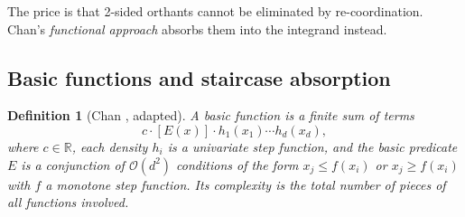\documentclass[11pt,a4paper]{article}
\newtheorem{definition}{Definition}
\theoremstyle{remark}
\newcommand{\R}{\mathbb{R}}
\newcommand{\Oh}{\mathcal{O}}
\begin{document}
The price is that 2-sided orthants cannot be eliminated by re-coordination.
Chan's \emph{functional approach} absorbs them into the integrand instead.

\subsection{Basic functions and staircase absorption}
\label{sec:absorb}

\begin{definition}[{Chan \cite[Def.~4.2]{Chan2013}}, adapted]
A \emph{basic function} is a finite sum of terms
\[
c\cdot [E(x)]\cdot h_1(x_1)\cdots h_d(x_d),
\]
where $c\in\R$, each \emph{density} $h_i$ is a univariate step function, and
the \emph{basic predicate} $E$ is a conjunction of $\Oh(d^2)$ conditions of
the form $x_j\le f(x_i)$ or $x_j\ge f(x_i)$ with $f$ a monotone step
function.  Its \emph{complexity} is the total number of pieces of all
functions involved.
\end{definition}
\end{document}
